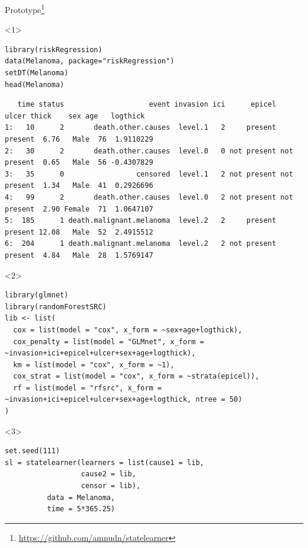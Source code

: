 \documentclass[smaller]{beamer}\usepackage{listings}
\begin{document}
\begin{frame}[label={sec:orgb6fa0a6},fragile]{Prototype\footnote{\url{https://github.com/amnudn/statelearner}}}
 \begin{onlyenv}<1>
\lstset{language=r,label= ,caption= ,captionpos=b,numbers=none}
\begin{lstlisting}
library(riskRegression)
data(Melanoma, package="riskRegression")
setDT(Melanoma)
head(Melanoma)
\end{lstlisting}

\begin{verbatim}
   time status                    event invasion ici      epicel       ulcer thick    sex age   logthick
1:   10      2       death.other.causes  level.1   2     present     present  6.76   Male  76  1.9110229
2:   30      2       death.other.causes  level.0   0 not present not present  0.65   Male  56 -0.4307829
3:   35      0                 censored  level.1   2 not present not present  1.34   Male  41  0.2926696
4:   99      2       death.other.causes  level.0   2 not present not present  2.90 Female  71  1.0647107
5:  185      1 death.malignant.melanoma  level.2   2     present     present 12.08   Male  52  2.4915512
6:  204      1 death.malignant.melanoma  level.2   2 not present     present  4.84   Male  28  1.5769147
\end{verbatim}
\end{onlyenv}

\begin{onlyenv}<2>
\lstset{language=r,label= ,caption= ,captionpos=b,numbers=none}
\begin{lstlisting}
library(glmnet)
library(randomForestSRC)
lib <- list(
  cox = list(model = "cox", x_form = ~sex+age+logthick),
  cox_penalty = list(model = "GLMnet", x_form = ~invasion+ici+epicel+ulcer+sex+age+logthick),
  km = list(model = "cox", x_form = ~1),
  cox_strat = list(model = "cox", x_form = ~strata(epicel)),
  rf = list(model = "rfsrc", x_form = ~invasion+ici+epicel+ulcer+sex+age+logthick, ntree = 50)
)
\end{lstlisting}
\end{onlyenv}

\begin{onlyenv}<3>
\lstset{language=r,label= ,caption= ,captionpos=b,numbers=none}
\begin{lstlisting}
set.seed(111)
sl = statelearner(learners = list(cause1 = lib,
				  cause2 = lib,
				  censor = lib),
		  data = Melanoma,
		  time = 5*365.25)
\end{lstlisting}


\end{onlyenv}
\end{frame}
\end{document}
